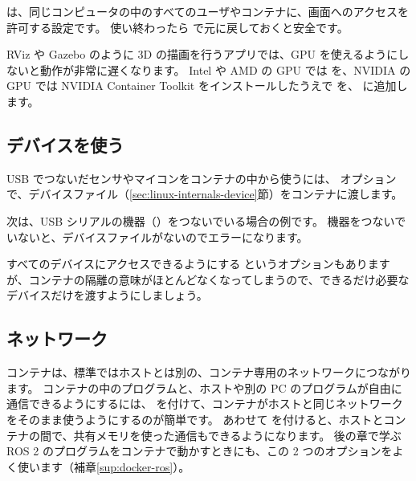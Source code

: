 \begin{caution}
   は、同じコンピュータの中のすべてのユーザやコンテナに、画面へのアクセスを許可する設定です。
  使い終わったら  で元に戻しておくと安全です。
\end{caution}

RViz や Gazebo のように 3D の描画を行うアプリでは、GPU を使えるようにしないと動作が非常に遅くなります。
Intel や AMD の GPU では  を、NVIDIA の GPU では NVIDIA Container Toolkit をインストールしたうえで  を、 に追加します。

\subsection{デバイスを使う}

USB でつないだセンサやマイコンをコンテナの中から使うには、 オプションで、デバイスファイル（\ref{sec:linux-internals-device}節）をコンテナに渡します。

次は、USB シリアルの機器（）をつないでいる場合の例です。
機器をつないでいないと、デバイスファイルがないのでエラーになります。


すべてのデバイスにアクセスできるようにする  というオプションもありますが、コンテナの隔離の意味がほとんどなくなってしまうので、できるだけ必要なデバイスだけを渡すようにしましょう。

\subsection{ネットワーク}

コンテナは、標準ではホストとは別の、コンテナ専用のネットワークにつながります。
コンテナの中のプログラムと、ホストや別の PC のプログラムが自由に通信できるようにするには、 を付けて、コンテナがホストと同じネットワークをそのまま使うようにするのが簡単です。
あわせて  を付けると、ホストとコンテナの間で、共有メモリを使った通信もできるようになります。
後の章で学ぶ ROS 2 のプログラムをコンテナで動かすときにも、この 2 つのオプションをよく使います（補章\ref{sup:docker-ros}）。


